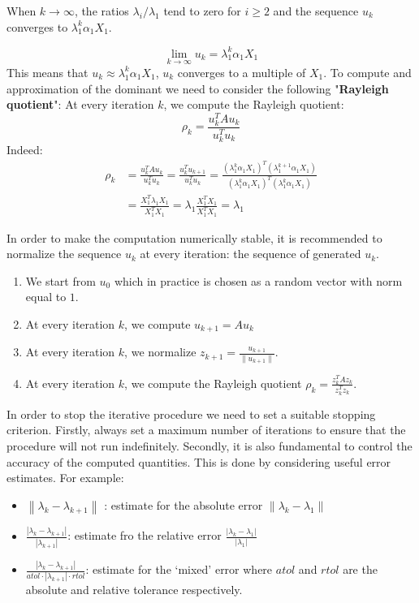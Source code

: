 When $k \rightarrow \infty$, the ratios $\lambda_i / \lambda_1$ tend to zero for $i \geq 2$ and
the sequence $u_k$ converges to $\lambda_1^k \alpha_1 X_1$.

$$ \lim_{k \rightarrow \infty} u_k = \lambda_1^k\alpha_1 X_1 $$
This means that $u_k \approx \lambda_1^k \alpha_1 X_1$, $u_k$ converges to a multiple of $X_1$.
To compute and approximation of the dominant we need to consider the following "\textbf{Rayleigh quotient}":
At every iteration $k$, we compute the Rayleigh quotient:
$$ \rho_k = \frac{u_k^T A u_k}{u_k^T u_k} $$
Indeed:
$$
\begin{aligned}
  \rho_k &= \frac{u_k^T A u_k}{u_k^T u_k} = \frac{u_k^T u_{k+1}}{u_k^T u_k} =\frac{(\lambda_1^k \alpha_1 X_1)^T (\lambda_1^{k+1} \alpha_1 X_1)}{(\lambda_1^k \alpha_1 X_1)^T (\lambda_1^k \alpha_1 X_1)} \\
  &= \frac{X_1^T\lambda_1X_1}{X_1^TX_1} = \lambda_1\frac{X_1^T X_1}{X_1^T X_1} = \lambda_1
\end{aligned}
$$

In order to make the computation numerically stable, it is recommended to normalize the sequence $u_k$ at every iteration:
the sequence of generated $u_k$.

\begin{enumerate}
    \item We start from $u_0$ which in practice is chosen as a random vector with norm equal to $1$.
    \item At every iteration $k$, we compute $u_{k + 1} = A u_k$
    \item At every iteration $k$, we normalize $z_{k + 1} = \frac{u_{k + 1}}{\|u_{k+1}\|}$.
    \item At every iteration $k$, we compute the Rayleigh quotient $\rho_k = \frac{z_k^T A z_k}{z_k^T z_k}$.
\end{enumerate}

In order to stop the iterative procedure we need to set a suitable stopping criterion.
Firstly, always set a maximum number of iterations to ensure that the procedure will not run indefinitely.
Secondly, it is also fundamental to control the accuracy of the computed quantities. This is done by considering useful error estimates.
For example:
\begin{itemize}
    \item \(\left\| \lambda_k - \lambda_{k+1} \right\| \) : estimate for the absolute error \(\left\| \lambda_k - \lambda_1 \right\|\)
    \item $\frac{|\lambda_k - \lambda_{k+1}|}{|\lambda_{k+1}|}$: estimate fro the relative error $\frac{|\lambda_k - \lambda_1|}{|\lambda_1|}$
    \item $\frac{|\lambda_k - \lambda_{k+1}|}{atol \cdot |\lambda_{k+1}|\cdot rtol}$: estimate for the `mixed' error where $atol$ and $rtol$ are the absolute and relative tolerance respectively.
\end{itemize}

